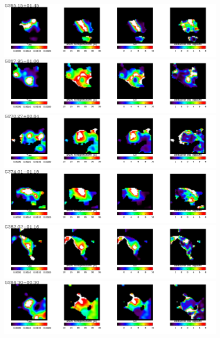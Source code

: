   \begin{figure}
\centering
\includegraphics[trim=0 2mm 0 0, clip, width=190mm]{appA/appA_66.pdf}
\includegraphics[trim=0 2mm 0 0, clip, width=190mm]{appA/appA_67.pdf}
\includegraphics[trim=0 2mm 0 0, clip, width=190mm]{appA/appA_68.pdf}
\includegraphics[trim=0 2mm 0 0, clip, width=190mm]{appA/appA_69.pdf}
\includegraphics[trim=0 2mm 0 0, clip, width=190mm]{appA/appA_70.pdf}
\includegraphics[trim=0 2mm 0 0, clip, width=190mm]{appA/appA_71.pdf}
  \end{figure}
  
